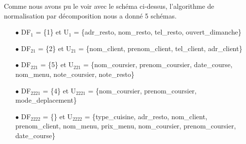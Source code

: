 \documentclass[french]{article}
\begin{document}
            \begin{landscape}
                \thispagestyle{empty}
            \end{landscape}
            \newpage
            
            Comme nous avons pu le voir avec le schéma ci-dessus, l'algorithme de normalisation par décomposition nous a donné 5 schémas.\bigskip
            \begin{enumerate}
                \item[$\bullet$] DF$_{1}$ = \{1\} et U$_{1}$ = \{adr\_resto, nom\_resto, tel\_resto, ouvert\_dimanche\}
                \item[$\bullet$] DF$_{21}$ = \{2\} et U$_{21}$ = \{nom\_client, prenom\_client, tel\_client, adr\_client\}
                \item[$\bullet$] DF$_{221}$ = \{5\} et U$_{221}$ = \{nom\_coursier, prenom\_coursier, date\_course, nom\_menu, \newline note\_coursier, note\_resto\}
                \item[$\bullet$] DF$_{2221}$ = \{4\} et U$_{2221}$ = \{nom\_coursier, prenom\_coursier, mode\_deplacement\}
                \item[$\bullet$] DF$_{2222}$ = \{\} et U$_{2222}$ = \{type\_cuisine, adr\_resto, nom\_client, prenom\_client, nom\_menu, prix\_menu, nom\_coursier, prenom\_coursier, date\_course\}\bigskip
            \end{enumerate}
            
\end{document}
